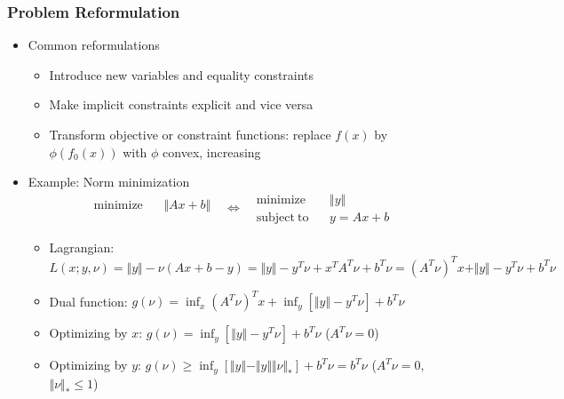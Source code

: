\subsubsection*{Problem Reformulation}
\begin{itemize}
    \item Common reformulations
    \begin{itemize}
        \item Introduce new variables and equality constraints
        \item Make implicit constraints explicit and vice versa
        \item Transform objective or constraint functions: replace $f(x)$ by $\phi(f_0(x))$ with $\phi$ convex, increasing
    \end{itemize}
    \item Example: Norm minimization
        $$ \begin{aligned}
            \mathrm{minimize}~~&~~\Vert Ax+b \Vert \\ {}
        \end{aligned}~~~\Leftrightarrow~~~\begin{aligned}
            \mathrm{minimize}~~&~~\Vert y\Vert \\
            \mathrm{subject~to}~~&~~y = Ax + b
        \end{aligned} $$
    \begin{itemize}
        \item Lagrangian: $L(x;y,\nu) = \Vert y\Vert-\nu(Ax+b-y) = \Vert y\Vert-y^T\nu+x^TA^T\nu+b^T\nu = (A^T\nu)^Tx + \Vert y\Vert - y^T\nu + b^T\nu$
        \item Dual function: $g(\nu) = \inf_{x}(A^T\nu)^Tx + \inf_{y}\left[\Vert y\Vert - y^T\nu\right] + b^T\nu$
        \item Optimizing by $x$: $g(\nu) = \inf_{y}\left[\Vert y\Vert - y^T\nu\right] + b^T\nu$ ($A^T\nu = 0$)
        \item Optimizing by $y$: $g(\nu)\geq\inf_{y}\left[\Vert y\Vert - \Vert y\Vert\Vert\nu\Vert_\ast\right]+b^T\nu = b^T\nu$ ($A^T\nu = 0$, $\Vert\nu\Vert_\ast\leq 1$)
    \end{itemize}
\end{itemize}
